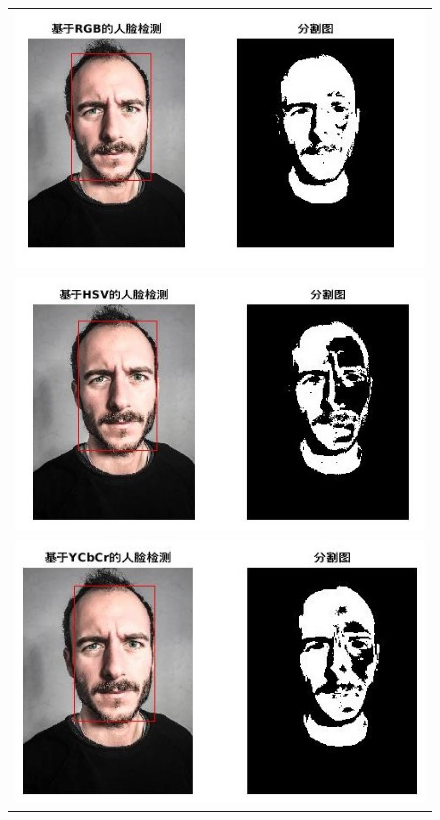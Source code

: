 \documentclass[logo,reportComp]{thesis}
\begin{document}
\begin{figure}[H]
\centering
\begin{tabular}{c}
\includegraphics[width=0.8\linewidth]{fig/test11.jpg}\\
\includegraphics[width=0.8\linewidth]{fig/test12.jpg}\\
\includegraphics[width=0.8\linewidth]{fig/test13.jpg}
\end{tabular}
\end{figure}
\end{document}
